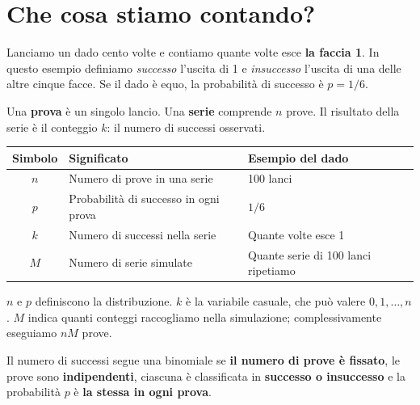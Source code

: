 \documentclass[
  italian,
  letterpaper,
  DIV=11,
  numbers=noendperiod]{scrreprt}
\newcounter{none} %
\begin{document}
\section{Che cosa stiamo contando?}\label{che-cosa-stiamo-contando}

Lanciamo un dado cento volte e contiamo quante volte esce \textbf{la
faccia 1}. In questo esempio definiamo \emph{successo} l'uscita di 1 e
\emph{insuccesso} l'uscita di una delle altre cinque facce. Se il dado è
equo, la probabilità di successo è \(p=1/6\).

Una \textbf{prova} è un singolo lancio. Una \textbf{serie} comprende
\(n\) prove. Il risultato della serie è il conteggio \(k\): il numero di
successi osservati.

{\def\LTcaptype{none} %
\begin{longtable}[]{@{}cll@{}}
\toprule\noalign{}
Simbolo & Significato & Esempio del dado \\
\midrule\noalign{}
\endhead
\bottomrule\noalign{}
\endlastfoot
\(n\) & Numero di prove in una serie & 100 lanci \\
\(p\) & Probabilità di successo in ogni prova & \(1/6\) \\
\(k\) & Numero di successi nella serie & Quante volte esce 1 \\
\(M\) & Numero di serie simulate & Quante serie di 100 lanci
ripetiamo \\
\end{longtable}
}

\(n\) e \(p\) definiscono la distribuzione. \(k\) è la variabile
casuale, che può valere \(0,1,\ldots,n\). \(M\) indica quanti conteggi
raccogliamo nella simulazione; complessivamente eseguiamo \(nM\) prove.

\begin{tcolorbox}[enhanced jigsaw, arc=.35mm, bottomrule=.15mm, bottomtitle=1mm, breakable, colback=white, colbacktitle=quarto-callout-important-color!10!white, colframe=quarto-callout-important-color-frame, coltitle=black, left=2mm, leftrule=.75mm, opacityback=0, opacitybacktitle=0.6, rightrule=.15mm, title={Quando si applica}, titlerule=0mm, toprule=.15mm, toptitle=1mm]

Il numero di successi segue una binomiale se \textbf{il numero di prove
è fissato}, le prove sono \textbf{indipendenti}, ciascuna è classificata
in \textbf{successo o insuccesso} e la probabilità \(p\) è \textbf{la
stessa in ogni prova}.

\end{tcolorbox}
\end{document}
